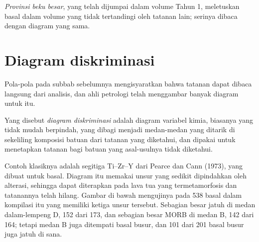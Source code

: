\emph{Provinsi beku besar}, yang telah dijumpai dalam volume Tahun 1, meletuskan basal dalam volume
yang tidak tertandingi oleh tatanan lain; serinya dibaca dengan diagram yang sama.

\section{Diagram diskriminasi}\label{sec:b2:magmatic-series:discrimination}

Pola-pola pada subbab sebelumnya mengisyaratkan bahwa tatanan dapat dibaca langsung dari analisis,
dan ahli petrologi telah menggambar banyak diagram untuk itu.

\begin{definition}\label{def:b2:magmatic-series:discrimination}
Yang disebut \emph{diagram diskriminasi} adalah diagram
variabel kimia, biasanya  yang tidak mudah berpindah, yang dibagi menjadi medan-medan yang ditarik
di sekeliling komposisi batuan dari tatanan yang diketahui, dan dipakai untuk menetapkan tatanan bagi
batuan yang asal-usulnya tidak diketahui.
\end{definition}

Contoh klasiknya adalah segitiga Ti--Zr--Y dari Pearce dan Cann (1973), yang dibuat untuk basal. Diagram itu
memakai unsur yang sedikit dipindahkan oleh alterasi, sehingga dapat diterapkan pada lava tua
yang termetamorfosis dan tatanannya telah hilang. Gambar di bawah mengujinya pada 538 basal dalam
kompilasi itu yang memiliki ketiga unsur tersebut. Sebagian besar  jatuh di
medan dalam-lempeng D, 152 dari 173, dan sebagian besar MORB di medan B, 142 dari 164; tetapi medan B
juga ditempati basal busur, dan 101 dari 201 basal busur juga jatuh di sana.

